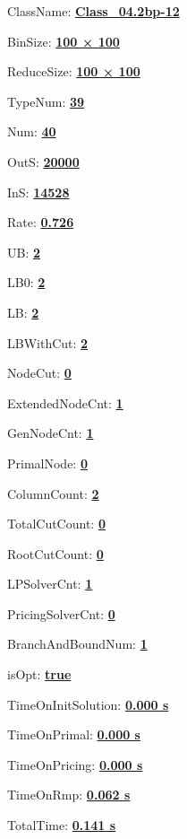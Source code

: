 \documentclass[11pt]{article}
\begin{document}
\pagestyle{empty}


ClassName: \underline{\textbf{Class_04.2bp-12}}
\par
BinSize: \underline{\textbf{100 × 100}}
\par
ReduceSize: \underline{\textbf{100 × 100}}
\par
TypeNum: \underline{\textbf{39}}
\par
Num: \underline{\textbf{40}}
\par
OutS: \underline{\textbf{20000}}
\par
InS: \underline{\textbf{14528}}
\par
Rate: \underline{\textbf{0.726}}
\par
UB: \underline{\textbf{2}}
\par
LB0: \underline{\textbf{2}}
\par
LB: \underline{\textbf{2}}
\par
LBWithCut: \underline{\textbf{2}}
\par
NodeCut: \underline{\textbf{0}}
\par
ExtendedNodeCnt: \underline{\textbf{1}}
\par
GenNodeCnt: \underline{\textbf{1}}
\par
PrimalNode: \underline{\textbf{0}}
\par
ColumnCount: \underline{\textbf{2}}
\par
TotalCutCount: \underline{\textbf{0}}
\par
RootCutCount: \underline{\textbf{0}}
\par
LPSolverCnt: \underline{\textbf{1}}
\par
PricingSolverCnt: \underline{\textbf{0}}
\par
BranchAndBoundNum: \underline{\textbf{1}}
\par
isOpt: \underline{\textbf{true}}
\par
TimeOnInitSolution: \underline{\textbf{0.000 s}}
\par
TimeOnPrimal: \underline{\textbf{0.000 s}}
\par
TimeOnPricing: \underline{\textbf{0.000 s}}
\par
TimeOnRmp: \underline{\textbf{0.062 s}}
\par
TotalTime: \underline{\textbf{0.141 s}}
\par
\newpage
\end{document}
